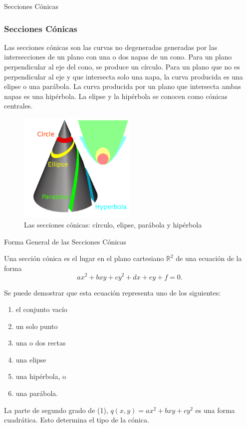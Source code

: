 \documentclass[xcolor={dvipsnames},aspectratio=169,10pt]{beamer}
\begin{document}
\begin{frame}{Secciones Cónicas}
  \frametitle{Secciones Cónicas}
  Las secciones cónicas son las curvas no degeneradas generadas por las intersecciones de un plano con una o dos napas de un cono. 
  Para un plano perpendicular al eje del cono, se produce un círculo. Para un plano que no es perpendicular al eje y que intersecta 
  solo una napa, la curva producida es una elipse o una parábola. La curva producida por un plano que intersecta ambas napas es una hipérbola. 
  La elipse y la hipérbola se conocen como cónicas centrales.
  \begin{figure}
    \includegraphics[width=0.5\textwidth, height=0.6\textheight, keepaspectratio]{images/conics.png}
    \caption{Las secciones cónicas: círculo, elipse, parábola y hipérbola}
  \end{figure}
\end{frame}

\begin{frame}{Forma General de las Secciones Cónicas}
  \begin{definition}
    Una sección cónica es el lugar en el plano cartesiano $\mathbb{R}^2$ de una ecuación de la forma
    \begin{equation*}
      ax^2 + bxy + cy^2 + dx + ey + f = 0. \tag{1}
    \end{equation*}
  \end{definition}
  Se puede demostrar que esta ecuación representa uno de los siguientes:
  \begin{enumerate}
    \item el conjunto vacío
    \item un solo punto
    \item una o dos rectas
    \item una elipse
    \item una hipérbola, o
    \item una parábola.
  \end{enumerate}
  La parte de segundo grado de (1), $q(x, y) = ax^2 + bxy + cy^2$ es una forma cuadrática. Esto determina el tipo de la cónica.
\end{frame}
\end{document}
